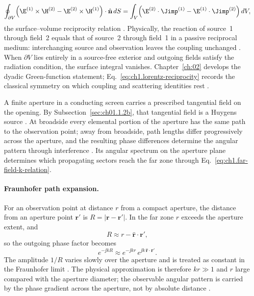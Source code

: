 \begin{equation}
\label{eq:ch1.lorentz-reciprocity}
\oint_{\partial V}\!\left(\E^{(1)}\times\H^{(2)}-\E^{(2)}\times\H^{(1)}\right)\cdot\hat{\mathbf{n}}\,dS
=\int_V\!\left(\E^{(2)}\cdot\Jimp^{(1)}-\E^{(1)}\cdot\Jimp^{(2)}\right)dV,
\end{equation}
the surface--volume reciprocity relation \cite{harrington2001,silver1949}. Physically, the reaction of source~1 through field~2 equals that of source~2 through field~1 in a passive reciprocal medium: interchanging source and observation leaves the coupling unchanged \cite{stratton1941}. When $\partial V$ lies entirely in a source-free exterior and outgoing fields satisfy the radiation condition, the surface integral vanishes. Chapter~\ref{ch:02} develops the dyadic Green-function statement; Eq.~\eqref{eq:ch1.lorentz-reciprocity} records the classical symmetry on which coupling and scattering identities rest \cite{tai1994}.


A finite aperture in a conducting screen carries a prescribed tangential field on the opening. By Subsection~\ref{sec:ch01.1.2b}, that tangential field is a Huygens source \cite{stratton1941,silver1949}. At broadside every elemental portion of the aperture has the same path to the observation point; away from broadside, path lengths differ progressively across the aperture, and the resulting phase differences determine the angular pattern through interference \cite{silver1949,stratton1941}. Its angular spectrum on the aperture plane determines which propagating sectors reach the far zone through Eq.~\eqref{eq:ch1.far-field-k-relation}.

\paragraph{Fraunhofer path expansion.}
For an observation point at distance $r$ from a compact aperture, the distance from an aperture point $\mathbf{r}'$ is $R=|\mathbf{r}-\mathbf{r}'|$. In the far zone $r$ exceeds the aperture extent, and
\begin{equation}
\label{eq:ch1.fraunhofer-path}
R\approx r-\hat{\mathbf{r}}\cdot\mathbf{r}',
\end{equation}
so the outgoing phase factor becomes
\begin{equation}
\label{eq:ch1.fraunhofer-phase}
e^{-\jj kR}\approx e^{-\jj kr}\,e^{\jj k\,\hat{\mathbf{r}}\cdot\mathbf{r}'}.
\end{equation}
The amplitude $1/R$ varies slowly over the aperture and is treated as constant in the Fraunhofer limit \cite{stratton1941,silver1949,bornwolf1999}. The physical approximation is therefore $kr\gg 1$ and $r$ large compared with the aperture diameter; the observable angular pattern is carried by the phase gradient across the aperture, not by absolute distance \cite{silver1949}.

